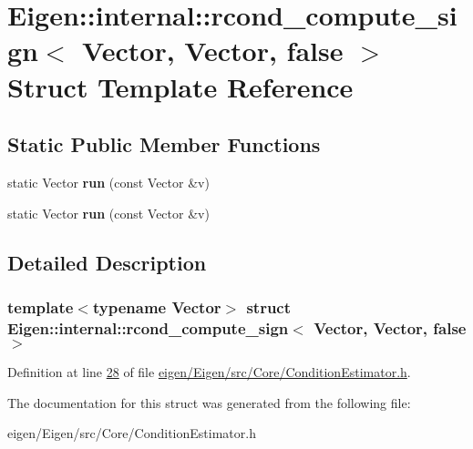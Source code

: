\hypertarget{struct_eigen_1_1internal_1_1rcond__compute__sign_3_01_vector_00_01_vector_00_01false_01_4}{}\section{Eigen\+:\+:internal\+:\+:rcond\+\_\+compute\+\_\+sign$<$ Vector, Vector, false $>$ Struct Template Reference}
\label{struct_eigen_1_1internal_1_1rcond__compute__sign_3_01_vector_00_01_vector_00_01false_01_4}
\subsection*{Static Public Member Functions}
\begin{DoxyCompactItemize}
\item 
\mbox{\label{struct_eigen_1_1internal_1_1rcond__compute__sign_3_01_vector_00_01_vector_00_01false_01_4_a74f76e8aa6893b263c4531e40094cbf2}} 
static Vector {\bfseries run} (const Vector \&v)
\item 
\mbox{\label{struct_eigen_1_1internal_1_1rcond__compute__sign_3_01_vector_00_01_vector_00_01false_01_4_a74f76e8aa6893b263c4531e40094cbf2}} 
static Vector {\bfseries run} (const Vector \&v)
\end{DoxyCompactItemize}


\subsection{Detailed Description}
\subsubsection*{template$<$typename Vector$>$\newline
struct Eigen\+::internal\+::rcond\+\_\+compute\+\_\+sign$<$ Vector, Vector, false $>$}



Definition at line \hyperlink{eigen_2_eigen_2src_2_core_2_condition_estimator_8h_source_l00028}{28} of file \hyperlink{eigen_2_eigen_2src_2_core_2_condition_estimator_8h_source}{eigen/\+Eigen/src/\+Core/\+Condition\+Estimator.\+h}.



The documentation for this struct was generated from the following file\+:\begin{DoxyCompactItemize}
\item 
eigen/\+Eigen/src/\+Core/\+Condition\+Estimator.\+h\end{DoxyCompactItemize}
